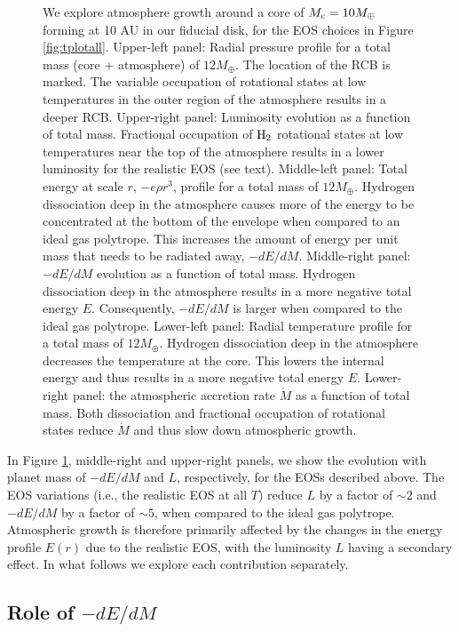 \documentclass[apj]{emulateapj}
\newcommand{\co}{_{\rm c}}
\begin{document}
\begin{figure}[tb]
{We explore atmosphere growth around a core of $M\co=10 M_{\oplus}$ forming at 10 AU in our fiducial disk, for the EOS choices in Figure \ref{fig:tplotall}.  Upper-left panel: Radial pressure profile for a total mass (core + atmosphere) of $12 M_{\oplus}$. The location of the RCB is marked. The variable occupation of rotational states at low temperatures in the outer region of the atmosphere results in a deeper RCB. Upper-right panel:  Luminosity evolution as a function of total mass. Fractional occupation of $\rm H_2$ rotational states at low temperatures near the top of the atmosphere results in a lower luminosity for the realistic EOS (see text). Middle-left panel: Total energy at scale $r$, $-e \rho r^3$, profile for a total mass of $12 M_{\oplus}$. Hydrogen dissociation deep in the atmosphere causes more of the energy to be concentrated at the bottom of the envelope when compared to an ideal gas polytrope. This increases the amount of energy per unit mass that needs to be radiated away, $-dE/dM$.  Middle-right panel:  $-dE/dM$ evolution as a function of total mass. Hydrogen dissociation deep in the atmosphere results in a more negative total energy $E$. Consequently, $-dE/dM$ is larger when compared to the ideal gas polytrope. Lower-left panel:  Radial temperature profile for a total mass of $12 M_{\oplus}$.  Hydrogen dissociation deep in the atmosphere decreases the temperature at the core. This lowers the internal energy and thus results in a more negative total energy $E$.   Lower-right panel: the atmospheric accretion rate $\dot{M}$ as a function of total mass. Both dissociation and fractional occupation of rotational states reduce $\dot{M}$ and thus slow down atmospheric growth.}
\label{fig:all_plot}
\end{figure}

In Figure \ref{fig:all_plot}, middle-right and upper-right panels, we show the evolution with planet mass of $-dE/dM$ and $L$, respectively, for the EOSs described above. The EOS variations (i.e., the realistic EOS at all $T$) reduce $L$ by a factor of $\sim$$2$ and $-dE/dM$ by a factor of $\sim$$5$, when compared to the ideal gas polytrope. Atmospheric growth is therefore primarily affected by the changes in the energy profile $E(r)$ due to the realistic EOS, with the luminosity $L$ having a secondary effect. In what follows we explore each contribution separately. 


\subsection{Role of $-dE/dM$}
\end{document}
